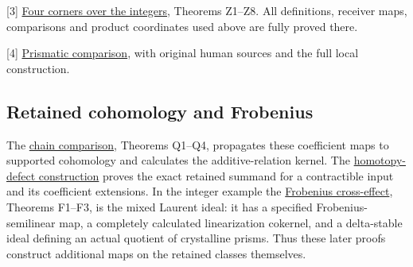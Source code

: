 \documentclass[
]{article}
\begin{document}
{[}3{]}
\href{https://github.com/KokunoYumeto/zeta-function-research-reader/blob/6af54ea3c8ef99127af327f3103e086c68d482c2/workbenches/splitzero-tandem/branches/identity-absorber-square/FOUR_CORNERS_OVER_Z.md}{Four
corners over the integers}, Theorems Z1--Z8. All definitions, receiver
maps, comparisons and product coordinates used above are fully proved
there.

{[}4{]}
\href{https://github.com/KokunoYumeto/zeta-function-research-reader/blob/6af54ea3c8ef99127af327f3103e086c68d482c2/workbenches/splitzero-tandem/branches/identity-absorber-square/PRISMATIC_COMPARISON.md}{Prismatic
comparison}, with original human sources and the full local
construction.

\subsection{Retained cohomology and
Frobenius}\label{retained-cohomology-and-frobenius}

The
\href{https://github.com/KokunoYumeto/zeta-function-research-reader/blob/6af54ea3c8ef99127af327f3103e086c68d482c2/workbenches/splitzero-tandem/branches/identity-absorber-square/CHAIN_COMPARISON.md}{chain
comparison}, Theorems Q1--Q4, propagates these coefficient maps to
supported cohomology and calculates the additive-relation kernel. The
\href{https://github.com/KokunoYumeto/zeta-function-research-reader/blob/6af54ea3c8ef99127af327f3103e086c68d482c2/workbenches/splitzero-tandem/branches/identity-absorber-square/HOMOTOPY_DEFECT.md}{homotopy-defect
construction} proves the exact retained summand for a contractible input
and its coefficient extensions. In the integer example the
\href{https://github.com/KokunoYumeto/zeta-function-research-reader/blob/6af54ea3c8ef99127af327f3103e086c68d482c2/workbenches/splitzero-tandem/branches/identity-absorber-square/FROBENIUS_CROSS_EFFECT.md}{Frobenius
cross-effect}, Theorems F1--F3, is the mixed Laurent ideal: it has a
specified Frobenius-semilinear map, a completely calculated
linearization cokernel, and a delta-stable ideal defining an actual
quotient of crystalline prisms. Thus these later proofs construct
additional maps on the retained classes themselves.
\end{document}
